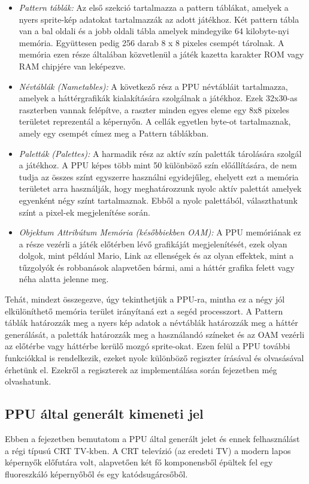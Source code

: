 \begin{itemize}
	\item \emph{Pattern táblák:} Az első szekció tartalmazza a pattern táblákat, amelyek a nyers sprite-kép adatokat tartalmazzák az adott játékhoz. Két pattern tábla van a bal oldali és a jobb oldali tábla amelyek mindegyike 64 kilobyte-nyi memória. Együttesen pedig 256 darab 8 x 8 pixeles csempét tárolnak. A memória ezen része általában közvetlenül 
	a játék kazetta karakter ROM vagy RAM chipjére van leképezve.
	\item \emph{Névtáblák (Nametables):} A következő rész a PPU névtábláit tartalmazza, amelyek a háttérgrafikák kialakítására szolgálnak a játékhoz. Ezek 32x30-as raszterben vannak felépítve, a raszter minden egyes eleme egy 8x8 pixeles területet reprezentál a képernyőn. A cellák egyetlen byte-ot tartalmaznak, amely egy csempét címez meg a Pattern táblákban.  
	\item \emph{Paletták (Palettes):} A harmadik rész az aktív szín paletták tárolására szolgál a játékhoz. A PPU képes több mint 50 különböző szín előállítására, de nem tudja az összes színt egyszerre használni egyidejűleg, ehelyett ezt a memória területet arra használják, hogy meghatározzunk nyolc aktív palettát amelyek egyenként négy színt tartalmaznak. Ebből a nyolc palettából, választhatunk színt a pixel-ek megjelenítése során.
	\item \emph{Objektum Attribútum Memória (későbbiekben OAM):} A PPU memóriának ez a része vezérli a játék előtérben lévő grafikáját megjelenítését, ezek olyan dolgok, mint például Mario, Link az ellenségek és az olyan effektek, mint a tűzgolyók és robbanások alapvetően bármi, ami a háttér grafika felett vagy néha alatta jelenne meg.
\end{itemize}

Tehát, mindezt összegezve, úgy tekinthetjük a PPU-ra, mintha ez a négy jól elkülöníthető memória terület irányítaná ezt a segéd processzort. A Pattern táblák határozzák meg a nyers kép adatok a névtáblák határozzák meg a háttér generálását, a paletták határozzák meg a használandó színeket és az OAM vezérli az előtérbe vagy háttérbe kerülő mozgó sprite-okat.
Ezen felül a PPU további funkciókkal is rendelkezik, ezeket nyolc különböző regiszter írásával és olvasásával érhetünk el. Ezekről a regiszterek az implementálása során  fejezetben még olvashatunk.

	\subsection{PPU által generált kimeneti jel}
	\label{subsec:PPU-CRT}
	Ebben a fejezetben bemutatom a PPU által generált jelet és ennek felhasználást a régi típusú CRT TV-kben. A CRT televízió (az eredeti TV) a modern lapos képernyők előfutára volt, alapvetően két fő komponensből épültek fel egy fluoreszkáló képernyőből és egy katódsugárcsőből. 
	
